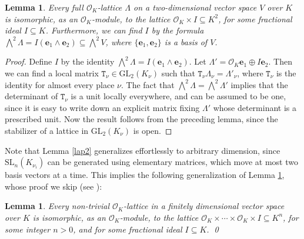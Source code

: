 \documentclass{article}
\newtheorem{Lem}[Prop]{Lemma}
\theoremstyle{definition}
\theoremstyle{remark}
\begin{document}
\begin{Lem}\label{lap3}
    Every full
    $\mathcal{O}_K$-lattice $\Lambda$ on a two-dimensional vector
    space $V$ over $K$ is isomorphic, as an $\mathcal{O}_K$-module, 
    to the lattice $\mathcal{O}_K\times I\subseteq K^2$,
    for some fractional ideal $I\subseteq K$.
    Furthermore, we can find $I$ by the formula
    $\bigwedge^{2}\Lambda=I(\mathbf{e}_1\wedge\mathbf{e}_2)
    \subseteq\bigwedge^{2}V$, where $\{\mathbf{e}_1,\mathbf{e}_2\}$
    is a basis of $V$.
\end{Lem}

\begin{proof}
Define $I$ by the identity
    $\bigwedge^{2}\Lambda=I(\mathbf{e}_1\wedge\mathbf{e}_2)$.
Let $\Lambda'=\mathcal{O}_K\mathbf{e}_1\oplus I\mathbf{e}_2$.
Then we can find a local matrix $\mathtt{T}_{\nu}\in 
\mathrm{GL}_2(K_{\nu})$
such that $\mathtt{T}_{\nu}\Lambda_{\nu}=\Lambda'_{\nu}$, 
where $\mathtt{T}_{\nu}$ is the identity
for almost every place $\nu$. The fact that 
$\bigwedge^{2}\Lambda=\bigwedge^{2}\Lambda'$ implies that the
determinant of $\mathtt{T}_{\nu}$ is a unit locally everywhere, and can be 
assumed to be one, since it is easy to write down an explicit
matrix fixing $\Lambda'$ whose determinant is a prescribed unit.
Now the result follows from the preceding lemma, since the stabilizer
of a lattice in $\mathrm{GL}_2(K_{\nu})$ is open.
\end{proof}

Note that Lemma \ref{lap2} generalizes effortlessly to 
arbitrary dimension,
since $\mathrm{SL}_n(K_{\nu_i})$ can be generated using 
elementary matrices, which move at most two basis vectors at 
a time. This implies the following generalization of 
Lemma \ref{lap3}, whose proof we skip (see \cite[\S81:5]{O73}):

\begin{Lem}\label{le1}
    Every non-trivial
    $\mathcal{O}_K$-lattice in a finitely dimensional vector
    space over $K$ is isomorphic, as an $\mathcal{O}_K$-module, to the
    lattice $\mathcal{O}_K\times\cdots\times\mathcal{O}_K\times I
    \subseteq K^n$,
    for some integer $n>0$, and for some fractional ideal $I\subseteq K$.
    \qed
\end{Lem}
\end{document}
